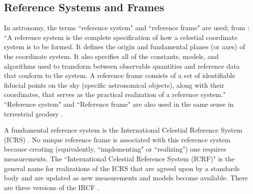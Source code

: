\documentclass[draft]{agujournal2019}
\begin{document}

\subsection{Reference Systems and Frames}
\label{sect:refsystems}

In astronomy, the terms ``reference system" and ``reference frame" are used; from : ``A reference system is the complete specification of how a celestial coordinate system is to be formed. It defines the origin and fundamental planes (or axes) of the coordinate system. It also specifies all of the constants, models, and algorithms used to transform between observable quantities and reference data that conform to the system. A reference frame consists of a set of identifiable fiducial points on the sky (specific astronomical objects), along with their coordinates, that serves as the practical realization of a reference system." ``Reference system" and ``Reference frame" are also used in the same sense in terrestrial geodesy \cite{Seitz2014}.




A fundamental reference system is the International Celestial Reference System (ICRS) \cite{Petit2010}. No unique reference frame is associated with this reference system because creating (equivalently, ``implementing" or ``realizing") one requires measurements. The ``International Celestial Reference System (ICRF)" is the general name for realizations of the ICRS that are agreed upon by a standards body and are updated as new measurements and models become available. There are three versions of the IRCF \cite{Charlot2020}. 
\end{document}
